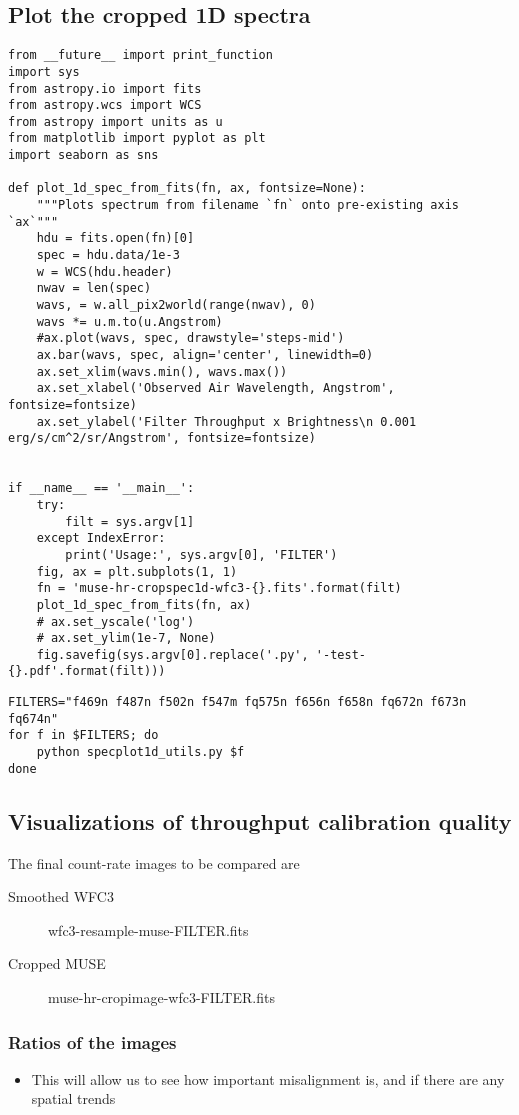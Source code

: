 \documentclass[11pt]{article}
\begin{document}
\subsection{Plot the cropped 1D spectra}
\label{sec:orgheadline39}
\begin{verbatim}
from __future__ import print_function
import sys
from astropy.io import fits
from astropy.wcs import WCS
from astropy import units as u
from matplotlib import pyplot as plt
import seaborn as sns

def plot_1d_spec_from_fits(fn, ax, fontsize=None):
    """Plots spectrum from filename `fn` onto pre-existing axis `ax`"""
    hdu = fits.open(fn)[0]
    spec = hdu.data/1e-3
    w = WCS(hdu.header)
    nwav = len(spec)
    wavs, = w.all_pix2world(range(nwav), 0)
    wavs *= u.m.to(u.Angstrom)
    #ax.plot(wavs, spec, drawstyle='steps-mid')
    ax.bar(wavs, spec, align='center', linewidth=0)
    ax.set_xlim(wavs.min(), wavs.max())
    ax.set_xlabel('Observed Air Wavelength, Angstrom', fontsize=fontsize)
    ax.set_ylabel('Filter Throughput x Brightness\n 0.001 erg/s/cm^2/sr/Angstrom', fontsize=fontsize)


if __name__ == '__main__':
    try:
        filt = sys.argv[1]
    except IndexError:
        print('Usage:', sys.argv[0], 'FILTER')
    fig, ax = plt.subplots(1, 1)
    fn = 'muse-hr-cropspec1d-wfc3-{}.fits'.format(filt)
    plot_1d_spec_from_fits(fn, ax)
    # ax.set_yscale('log')
    # ax.set_ylim(1e-7, None)
    fig.savefig(sys.argv[0].replace('.py', '-test-{}.pdf'.format(filt)))
\end{verbatim}

\begin{verbatim}
FILTERS="f469n f487n f502n f547m fq575n f656n f658n fq672n f673n fq674n"
for f in $FILTERS; do
    python specplot1d_utils.py $f
done
\end{verbatim}

\subsection{Visualizations of throughput calibration quality}
\label{sec:orgheadline43}
The final count-rate images to be compared are 
\begin{description}
\item[{Smoothed WFC3}] wfc3-resample-muse-FILTER.fits
\item[{Cropped MUSE}] muse-hr-cropimage-wfc3-FILTER.fits
\end{description}
\subsubsection{Ratios of the images}
\label{sec:orgheadline40}
\begin{itemize}
\item This will allow us to see how important misalignment is, and if there are any spatial trends
\end{itemize}
\end{document}
